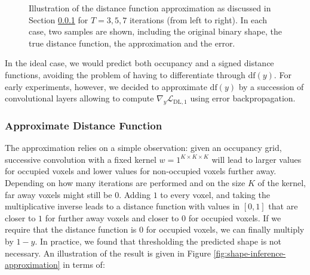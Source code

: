 \begin{figure}
  \caption{Illustration of the distance function approximation as discussed in
  Section \ref{sec:shape-inference-distance-function-appr} for $T = 3, 5, 7$
  iterations (from left to right). In each case, two samples are shown, including
  the original binary shape, the true distance function, the approximation and
  the error.}
  \label{fig:shape-inference-distance transform}
\end{figure}

In the ideal case, we would predict both occupancy and a signed distance functions,
avoiding the problem of having to differentiate through $\text{df}(y)$. For early
experiments, however, we decided to approximate $\text{df}(y)$ by a succession
of convolutional layers allowing to compute $\nabla_y \mathcal{L}_{\text{DL},1}$
using error backpropagation.

\subsubsection{Approximate Distance Function}
\label{sec:shape-inference-distance-function-appr}

The approximation relies on a simple observation: given an occupancy grid,
successive convolution with a fixed kernel $w = 1^{K \times K \times K}$ will lead to larger values
for occupied voxels and lower values for non-occupied voxels further away.
Depending on how many iterations are performed and on the size $K$ of the kernel,
far away voxels might still be $0$. Adding $1$ to every voxel, and taking the
multiplicative inverse leads to a distance function with values in $[0,1]$ that are closer to $1$
for further away voxels and closer to $0$ for occupied voxels. If we require that
the distance function is $0$ for occupied voxels, we can finally multiply by $1-y$.
In practice, we found that thresholding the predicted shape is not necessary.
An illustration of the result is given in Figure \ref{fig:shape-inference-approximation}
in terms of:

